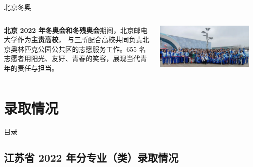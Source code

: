 \documentclass[aspectratio=169, utf8, fontset=windows]{beamer}
\begin{document}
\begin{frame}{北京冬奥}
    \begin{columns}
        \setlength{\parindent}{2em}

        \textcolor{Fore}{\textbf{北京 2022 年冬奥会和冬残奥会}}期间，北京邮电大学作为\textcolor{Fore}{\textbf{主责高校}}，
        与三所配合高校共同负责北京奥林匹克公园公共区的志愿服务工作。655 名志愿者用阳光、友好、青春的笑容，展现当代青年的责任与担当。

        \includegraphics[width=\textwidth]{./resources/29.png}
    \end{columns}
\end{frame}

\section{录取情况}

\begin{frame}{目录}
    \begin{multicols}{2}
        \tableofcontents[currentsection]
    \end{multicols}
\end{frame}

\subsection*{江苏省 2022 年分专业（类）录取情况}
\end{document}
